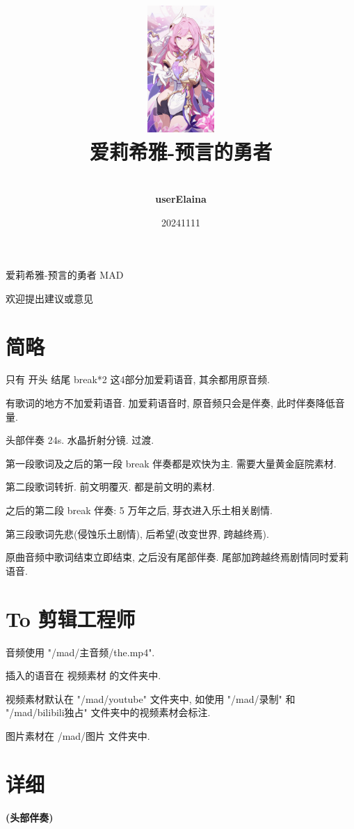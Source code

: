 \documentclass[a4paper]{article}
\title{
    \vspace*{1.0in}
    \includegraphics[width=1in]{figures/100154449_p0.jpg} \\
    \vspace*{1in}
    \textbf{\Huge 爱莉希雅-预言的勇者}
    \vspace{0.5in}
}
\author{ \\
    \textbf{\huge userElaina} \\
    \vspace*{1in}
}
\date{\LARGE 20241111}
\begin{document}
\LARGE

\maketitle
\tableofcontents
\thispagestyle{empty}
\newpage

爱莉希雅-预言的勇者 MAD

欢迎提出建议或意见

\section{简略}

只有 开头 结尾 break*2 这4部分加爱莉语音, 其余都用原音频.

有歌词的地方不加爱莉语音. 加爱莉语音时, 原音频只会是伴奏, 此时伴奏降低音量.

头部伴奏 24s. 水晶折射分镜. 过渡.

第一段歌词及之后的第一段 break 伴奏都是欢快为主. 需要大量黄金庭院素材.

第二段歌词转折. 前文明覆灭. 都是前文明的素材.

之后的第二段 break 伴奏: 5 万年之后, 芽衣进入乐土相关剧情.

第三段歌词先悲(侵蚀乐土剧情), 后希望(改变世界, 跨越终焉).

原曲音频中歌词结束立即结束, 之后没有尾部伴奏. 尾部加跨越终焉剧情同时爱莉语音.

\section{To 剪辑工程师}

音频使用 "/mad/主音频/the.mp4".

插入的语音在 视频素材 的文件夹中.

视频素材默认在 "/mad/youtube" 文件夹中, 如使用 "/mad/录制" 和 "/mad/bilibili独占" 文件夹中的视频素材会标注.

图片素材在 /mad/图片 文件夹中.



\section{详细}

\textbf{(头部伴奏)}
\end{document}
